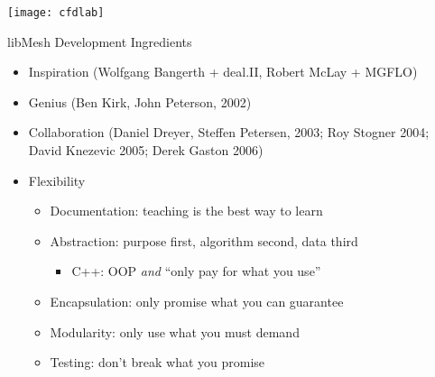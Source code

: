 \frame
{
  \begin{center}
  \texttt{[image: cfdlab]}
  \end{center}

  \begin{block}{libMesh Development Ingredients}
  \pause
  \begin{itemize}[<+->]
    \item Inspiration (Wolfgang Bangerth + deal.II, Robert McLay + MGFLO)
    \item Genius (Ben Kirk, John Peterson, 2002)
    \item Collaboration (Daniel Dreyer, Steffen Petersen, 2003; Roy
      Stogner 2004; David Knezevic 2005; Derek Gaston 2006)
    \item Flexibility
      \begin{itemize}[<+->]
        \item Documentation: teaching is the best way to learn
        \item Abstraction: purpose first, algorithm second, data third
          \begin{itemize}[<+->]
            \item C++: OOP \emph{and} ``only pay for what you use''
          \end{itemize}
        \item Encapsulation: only promise what you can guarantee
        \item Modularity: only use what you must demand
        \item Testing: don't break what you promise
      \end{itemize}
  \end{itemize}  
  \end{block}


}


 




